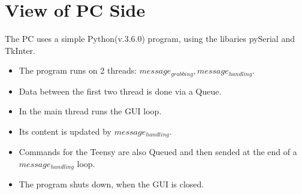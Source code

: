 \documentclass{book}
\begin{document}
\chapter{View of PC Side}
The PC uses a simple Python(v.3.6.0) program, using the libaries pySerial and TkInter.
\begin{itemize}
\item The program runs on 2 threads: $message_{grabbing}, message_{handling}$.
\item Data between the first two thread is done via a Queue.
\item In the main thread runs the GUI loop.
\item Its content is updated by $message_{handling}$.
\item Commands for the Teensy are also Queued and then sended at the end of a $message_{handling}$ loop.
\item The program shuts down, when the GUI is closed.
\end{itemize} 
\end{document}
